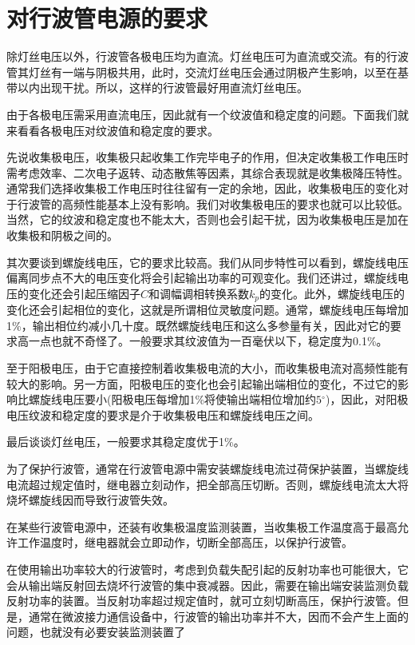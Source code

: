 \section{对行波管电源的要求}
除灯丝电压以外，行波管各极电压均为直流。灯丝电压可为直流或交流。有的行波管其灯丝有一端与阴极共用，此时，交流灯丝电压会通过阴极产生影响，以至在基带以内出现干扰。所以，这样的行波管最好用直流灯丝电压。


由于各极电压需采用直流电压，因此就有一个纹波值和稳定度的问题。下面我们就来看看各极电压对纹波值和稳定度的要求。


先说收集极电压，收集极只起收集工作完毕电子的作用，但决定收集极工作电压时需考虑效率、二次电子返转、动态散焦等因素，其综合表现就是收集极降压特性。通常我们选择收集极工作电压时往往留有一定的余地，因此，收集极电压的变化对于行波管的高频性能基本上没有影响。我们对收集极电压的要求也就可以比较低。当然，它的纹波和稳定度也不能太大，否则也会引起干扰，因为收集极电压是加在收集极和阴极之间的。


其次要谈到螺旋线电压，它的要求比较高。我们从同步特性可以看到，螺旋线电压偏离同步点不大的电压变化将会引起输出功率的可观变化。我们还讲过，螺旋线电压的变化还会引起压缩因子$ C $和调幅调相转换系数$ k_p $的变化。此外，螺旋线电压的变化还会引起相位的变化，这就是所谓相位灵敏度问题。通常，螺旋线电压每增加1\%，输出相位约减小几十度。既然螺旋线电压和这么多参量有关，因此对它的要求高一点也就不奇怪了。一般要求其纹波值为一百毫伏以下，稳定度为0.1\%。

至于阳极电压，由于它直接控制着收集极电流的大小，而收集极电流对高频性能有较大的影响。另一方面，阳极电压的变化也会引起输出端相位的变化，不过它的影响比螺旋线电压要小(阳极电压每增加1\%将使输出端相位增加约$ 5{}^\circ $)，因此，对阳极电压纹波和稳定度的要求是介于收集极电压和螺旋线电压之间。


最后谈谈灯丝电压，一般要求其稳定度优于1\%。


为了保护行波管，通常在行波管电源中需安装螺旋线电流过荷保护装置，当螺旋线电流超过规定值时，继电器立刻动作，把全部高压切断。否则，螺旋线电流太大将烧坏螺旋线因而导致行波管失效。


在某些行波管电源中，还装有收集极温度监测装置，当收集极工作温度高于最高允许工作温度时，继电器就会立即动作，切断全部高压，以保护行波管。


在使用输出功率较大的行波管时，考虑到负载失配引起的反射功率也可能很大，它会从输出端反射回去烧坏行波管的集中衰减器。因此，需要在输出端安装监测负载反射功率的装置。当反射功率超过规定值时，就可立刻切断高压，保护行波管。但是，通常在微波接力通信设备中，行波管的输出功率并不大，因而不会产生上面的问题，也就没有必要安装监测装置了


